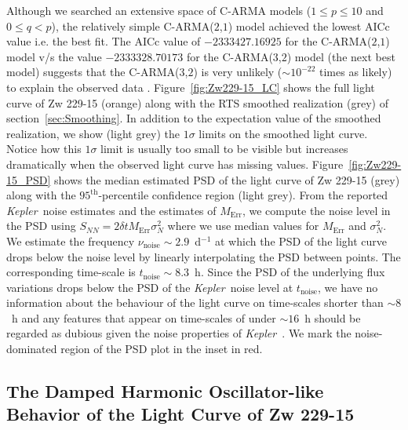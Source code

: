\documentclass[a4paper,fleqn,usenatbib]{mnras}
\newcommand{\Kepler}{\textit{Kepler~}}
\begin{document}
Although we searched an extensive space of C-ARMA models ($1 \leq p \leq 10$ and $0 \leq q < p$), the relatively simple C-ARMA($2$,$1$) model achieved the lowest AICc value i.e. the best fit. The AICc value of $-2333427.16925$ for the C-ARMA($2$,$1$) model v/s the value $-2333328.70173$ for the C-ARMA($3$,$2$) model (the next best model) suggests that the C-ARMA($3$,$2$) is very unlikely ($\sim 10^{-22}$ times as likely) to explain the observed data \citep{ModelSelection}. Figure~\ref{fig:Zw229-15_LC} shows the full light curve of Zw 229-15 (orange) along with the RTS smoothed realization (grey) of section~\ref{sec:Smoothing}. In addition to the expectation value of the smoothed realization, we show (light grey) the $1\sigma$ limits on the smoothed light curve. Notice how this $1\sigma$ limit is usually too small to be visible but increases dramatically when the observed light curve has missing values. Figure~\ref{fig:Zw229-15_PSD} shows the median estimated PSD of the light curve of Zw 229-15 (grey) along with the $95^{\mathrm{th}}$-percentile confidence region (light grey). From the reported \Kepler noise estimates and the estimates of $M_{\mathrm{Err}}$, we compute the noise level in the PSD using $S_{NN} = 2\delta t M_{\mathrm{Err}} \sigma^{2}_{N}$ where we use median values for $M_{\mathrm{Err}}$ and $\sigma^{2}_{N}$. We estimate the frequency $\nu_{\mathrm{noise}} \sim 2.9$~d$^{-1}$ at which the PSD of the light curve drops below the noise level by linearly interpolating the PSD between points. The corresponding time-scale is $t_{\mathrm{noise}} \sim 8.3$~h. Since the PSD of the underlying flux variations drops below the PSD of the \Kepler noise level at $t_{\mathrm{noise}}$, we have no information about the behaviour of the light curve on time-scales shorter than $\sim 8$~h and any features that appear on time-scales of under $\sim 16$~h should be regarded as dubious given the noise properties of \Kepler. We mark the noise-dominated region of the PSD plot in the inset in red. 

\subsection[dHO Behavior of Zw 229-15]{The Damped Harmonic Oscillator-like Behavior of the Light Curve of Zw 229-15}\label{sec:DHO}
\end{document}
